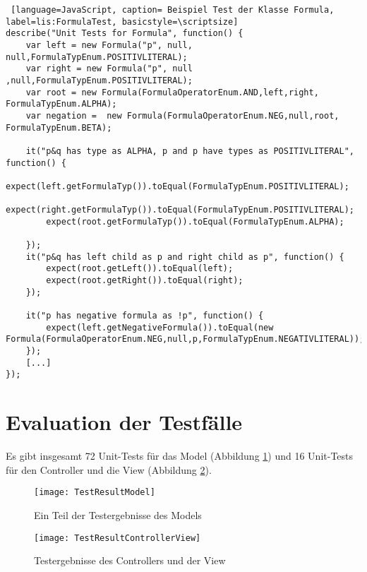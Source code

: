 \begin{lstlisting} [language=JavaScript, caption= Beispiel Test der Klasse Formula, label=lis:FormulaTest, basicstyle=\scriptsize]
describe("Unit Tests for Formula", function() {
    var left = new Formula("p", null, null,FormulaTypEnum.POSITIVLITERAL);
    var right = new Formula("p", null ,null,FormulaTypEnum.POSITIVLITERAL);
    var root = new Formula(FormulaOperatorEnum.AND,left,right, FormulaTypEnum.ALPHA);
    var negation =  new Formula(FormulaOperatorEnum.NEG,null,root, FormulaTypEnum.BETA);

    it("p&q has type as ALPHA, p and p have types as POSITIVLITERAL", function() {
        expect(left.getFormulaTyp()).toEqual(FormulaTypEnum.POSITIVLITERAL);
        expect(right.getFormulaTyp()).toEqual(FormulaTypEnum.POSITIVLITERAL);
        expect(root.getFormulaTyp()).toEqual(FormulaTypEnum.ALPHA);

    });
    it("p&q has left child as p and right child as p", function() {
        expect(root.getLeft()).toEqual(left);
        expect(root.getRight()).toEqual(right);
    });

    it("p has negative formula as !p", function() {
        expect(left.getNegativeFormula()).toEqual(new Formula(FormulaOperatorEnum.NEG,null,p,FormulaTypEnum.NEGATIVLITERAL));
    });
	[...]
});
\end{lstlisting}


\section{Evaluation der Testfälle}
Es gibt insgesamt 72 Unit-Tests für das Model (Abbildung \ref{fig:TestResultModel}) und 16 Unit-Tests für den Controller und die View (Abbildung \ref{fig:TestResultControllerView}).

\begin{figure}[ !h] \centering
\texttt{[image: TestResultModel]}
\caption[Testergebnisse des Models]{Ein Teil der Testergebnisse des Models}\label{fig:TestResultModel}
\end{figure}

\begin{figure}[ !h] \centering
\texttt{[image: TestResultControllerView]}
\caption[Testergebnisse des Controllers und der View]{Testergebnisse des Controllers und der View}\label{fig:TestResultControllerView}
\end{figure}

